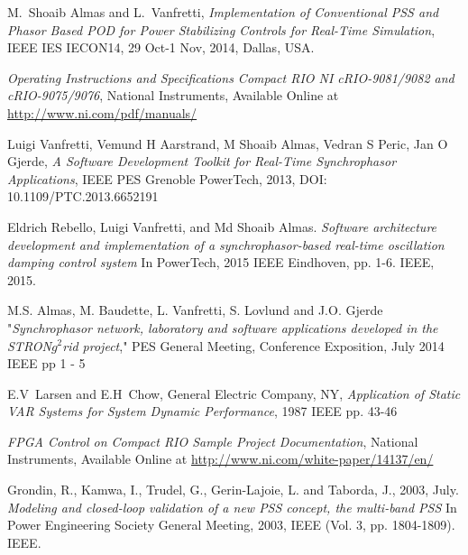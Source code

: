 \documentclass[journal]{IEEEtran}
\begin{document}
\begin{thebibliography}{1}
 M.~Shoaib Almas and L.~Vanfretti, \emph{Implementation of Conventional PSS and Phasor Based POD for Power Stabilizing Controls for Real-Time Simulation}, IEEE IES IECON14, 29 Oct-1 Nov, 2014, Dallas, USA.

 \emph{Operating Instructions and Specifications Compact RIO NI cRIO-9081/9082 and cRIO-9075/9076}, National Instruments, Available Online at \url{http://www.ni.com/pdf/manuals/}

 Luigi Vanfretti, Vemund H Aarstrand, M Shoaib Almas, Vedran S Peric, Jan O Gjerde, \emph{A Software Development Toolkit for Real-Time Synchrophasor Applications},  IEEE PES Grenoble PowerTech, 2013, DOI: 10.1109/PTC.2013.6652191

Eldrich Rebello, Luigi Vanfretti, and Md Shoaib Almas. \emph{Software architecture development and implementation of a synchrophasor-based real-time oscillation damping control system} In PowerTech, 2015 IEEE Eindhoven, pp. 1-6. IEEE, 2015.

 M.S. Almas, M. Baudette, L. Vanfretti, S. Lovlund and J.O. Gjerde "\emph{Synchrophasor network, laboratory and software applications developed in the STRON$g^{2}$rid project}," PES General Meeting, Conference Exposition, July 2014 IEEE pp 1 - 5

 E.V~Larsen and E.H~Chow, General Electric Company, NY, \emph{Application of Static VAR Systems for System Dynamic Performance}, 1987 IEEE pp. 43-46






  

 \emph{FPGA Control on Compact RIO Sample Project Documentation}, National Instruments, Available Online at \url{http://www.ni.com/white-paper/14137/en/}


 Grondin, R., Kamwa, I., Trudel, G., Gerin-Lajoie, L. and Taborda, J., 2003, July. \emph{Modeling and closed-loop validation of a new PSS concept, the multi-band PSS} In Power Engineering Society General Meeting, 2003, IEEE (Vol. 3, pp. 1804-1809). IEEE.


\end{thebibliography}
\end{document}
